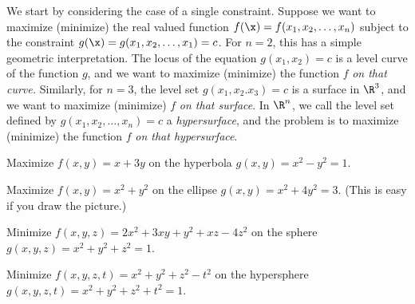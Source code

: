 We start by considering the case of a single constraint.
  Suppose we want to maximize (minimize)
%
the real valued function  $f(\x) = f(x_1,x_2,\dots,x_n)$
subject to the constraint $g(\x) = g(x_1,x_2,\dots,
x_1) = c$.   For $n = 2$, this has a simple geometric interpretation.
The locus of the equation $g(x_1, x_2) = c$ is a level curve of the function $g$,
and we want to maximize (minimize) the function $f$ {\it on that
curve.}   Similarly, for $n = 3$, the level set  $g(x_1,x_2.x_3) = c$
is a surface in $\R^3$, and we want to
maximize (minimize) $f$ {\it on that surface}.  In $\R^n$, we call the
level set defined by $g(x_1,x_2,\dots, x_n) = c$ a 
{\it hypersurface\/}, and the problem is to maximize (minimize) the function
%
$f$ {\it on that hypersurface}.
\medskip
\centerline{}
\medskip
{}
Maximize $f(x,y) = x + 3y$ on the hyperbola  $g(x,y) = x^2 - y^2 = 1$.

Maximize $f(x,y) = x^2 + y^2$ on the ellipse $g(x,y) = x^2 + 4y^2 = 3$.  (This is
easy if you draw the picture.) 

Minimize $f(x,y,z) = 2x^2 + 3xy + y^2 + xz - 4z^2$ on the sphere
$g(x,y,z) = x^2 + y^2 + z^2 = 1$.

Minimize $f(x,y,z,t) = x^2 + y^2 + z^2 - t^2$ on the hypersphere
$g(x,y,z,t) = x^2 + y^2 + z^2 + t^2 = 1$.
\endexample



